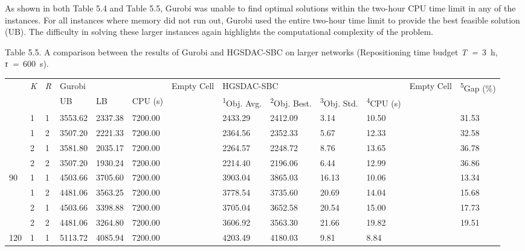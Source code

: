 \documentclass[
  english,
]{article}
\newcounter{none} %
\begin{document}
\begin{otherlanguage}{english}
\protect{}\label{p0655}
As shown in both Table 5.4 and Table 5.5, Gurobi was unable to find optimal solutions within the
two-hour CPU time limit in any of the instances. For all instances where memory did not run out,
Gurobi used the entire two-hour time limit to provide the best feasible solution (UB). The
difficulty in solving these larger instances again highlights the computational complexity of the
problem.

\protect{}\label{t0030}
Table 5.5. A comparison between the results of Gurobi and HGSDAC-SBC on larger networks
(Repositioning time budget \emph{T~=}~3~h, \emph{τ~=}~600~s).

{\def\LTcaptype{none} %
\begin{longtable}[]{@{}lllllllllllll@{}}
\toprule\noalign{}
\multirow{2}{*}{\textbar{}\emph{S}\textbar{}} & \multirow{2}{*}{\textbar{}\emph{K}\textbar{}} &
\multirow{2}{*}{\textbar{}\emph{R}\textbar{}} & \multicolumn{3}{l}{%
Gurobi} & \multirow{2}{*}{Empty Cell} & \multicolumn{4}{l}{%
HGSDAC-SBC} & \multirow{2}{*}{Empty Cell} & \multirow{2}{*}{\textsuperscript{5}Gap (\%)} \\
& & & UB & LB & CPU (s) & & \textsuperscript{1}Obj. Avg. & \textsuperscript{2}Obj. Best. &
\textsuperscript{3}Obj. Std. & \textsuperscript{4}CPU (s) \\
\midrule\noalign{}
\endhead
\bottomrule\noalign{}
\endlastfoot
\multirow{4}{*}{60} & 1 & 1 & 3553.62 & 2337.38 & 7200.00 & & 2433.29 & 2412.09 & 3.14 & 10.50 & &
31.53 \\
& 1 & 2 & 3507.20 & 2221.33 & 7200.00 & & 2364.56 & 2352.33 & 5.67 & 12.33 & & 32.58 \\
& 2 & 1 & 3581.80 & 2035.17 & 7200.00 & & 2264.57 & 2248.72 & 8.76 & 13.65 & & 36.78 \\
& 2 & 2 & 3507.20 & 1930.24 & 7200.00 & & 2214.40 & 2196.06 & 6.44 & 12.99 & & 36.86 \\
\multirow{4}{*}{90} & 1 & 1 & 4503.66 & 3705.60 & 7200.00 & & 3903.04 & 3865.03 & 16.13 & 10.06 & &
13.34 \\
& 1 & 2 & 4481.06 & 3563.25 & 7200.00 & & 3778.54 & 3735.60 & 20.69 & 14.04 & & 15.68 \\
& 2 & 1 & 4503.66 & 3398.88 & 7200.00 & & 3705.04 & 3652.58 & 20.54 & 15.00 & & 17.73 \\
& 2 & 2 & 4481.06 & 3264.80 & 7200.00 & & 3606.92 & 3563.30 & 21.66 & 19.82 & & 19.51 \\
\multirow{4}{*}{120} & 1 & 1 & 5113.72 & 4085.94 & 7200.00 & & 4203.49 & 4180.03 & 9.81 & 8.84 & &

\end{longtable}}
\end{otherlanguage}
\end{document}
